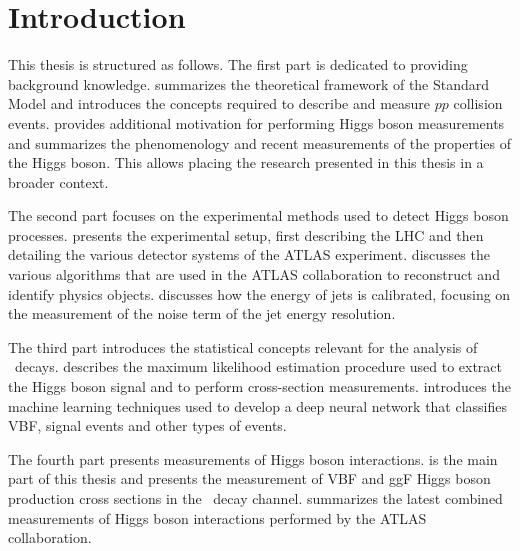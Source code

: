 \chapter{Introduction}
\label{chap:introduction}




\quad \newline

This thesis is structured as follows. 
The first part is dedicated to providing background knowledge.
 summarizes the theoretical framework of the Standard Model and introduces the concepts required to describe and measure $pp$ collision events.
 provides additional motivation for performing Higgs boson measurements and summarizes the phenomenology and recent measurements of the properties of the Higgs boson. This allows placing the research presented in this thesis in a broader context.

The second part focuses on the experimental methods used to detect Higgs boson processes. 
 presents the experimental setup, first describing the LHC and then detailing the various detector systems of the ATLAS experiment.
 discusses the various algorithms that are used in the ATLAS collaboration to reconstruct and identify physics objects.
 discusses how the energy of jets is calibrated, focusing on the measurement of the noise term of the jet energy resolution.

The third part introduces the statistical concepts relevant for the analysis of \HWW\ decays. 
 describes the maximum likelihood estimation procedure used to extract the Higgs boson signal and to perform cross-section measurements.
 introduces the machine learning techniques used to develop a deep neural network that classifies VBF, \HWW signal events and other types of events.

The fourth part presents measurements of Higgs boson interactions.
 is the main part of this thesis and presents the measurement of VBF and ggF Higgs boson production cross sections in the \HWW\ decay channel.
 summarizes the latest combined measurements of Higgs boson interactions performed by the ATLAS collaboration.

